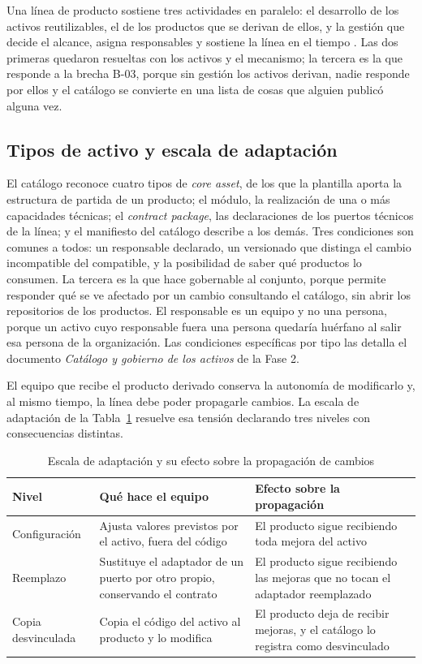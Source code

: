 Una línea de producto sostiene tres actividades en paralelo: el desarrollo de
los activos reutilizables, el de los productos que se derivan de ellos, y la
gestión que decide el alcance, asigna responsables y sostiene la línea en el
tiempo \citep{Clements2001}. Las dos primeras quedaron resueltas con los
activos y el mecanismo; la tercera es la que responde a la brecha B-03, porque
sin gestión los activos derivan, nadie responde por ellos y el catálogo se
convierte en una lista de cosas que alguien publicó alguna vez.

\subsection{Tipos de activo y escala de adaptación}

El catálogo reconoce cuatro tipos de \emph{core asset}, de los que la
plantilla aporta la estructura de partida de un producto; el módulo, la
realización de una o más capacidades técnicas; el \emph{contract package}, las
declaraciones de los puertos técnicos de la línea; y el manifiesto del
catálogo describe a los demás. Tres condiciones son comunes a todos: un
responsable declarado, un versionado que distinga el cambio incompatible del
compatible, y la posibilidad de saber qué productos lo consumen. La tercera es
la que hace gobernable al conjunto, porque permite responder qué se ve
afectado por un cambio consultando el catálogo, sin abrir los repositorios de
los productos. El responsable es un equipo y no una persona, porque un activo
cuyo responsable fuera una persona quedaría huérfano al salir esa persona de
la organización. Las condiciones específicas por tipo las detalla el documento
\emph{Catálogo y gobierno de los activos} de la Fase 2.

El equipo que recibe el producto derivado conserva la autonomía de
modificarlo y, al mismo tiempo, la línea debe poder propagarle cambios. La
escala de adaptación de la Tabla~\ref{tab:adaptacion} resuelve esa tensión
declarando tres niveles con consecuencias distintas.

\begin{table}[H]
\centering
{\footnotesize
\begin{tabular}{p{2.8cm}p{5.6cm}p{6.3cm}}
\toprule
\textbf{Nivel} & \textbf{Qué hace el equipo} & \textbf{Efecto sobre la propagación} \\
\midrule
Configuración & Ajusta valores previstos por el activo, fuera del código & El producto sigue recibiendo toda mejora del activo \\
Reemplazo & Sustituye el adaptador de un puerto por otro propio, conservando el contrato & El producto sigue recibiendo las mejoras que no tocan el adaptador reemplazado \\
Copia desvinculada & Copia el código del activo al producto y lo modifica & El producto deja de recibir mejoras, y el catálogo lo registra como desvinculado \\
\bottomrule
\end{tabular}
}
\caption{Escala de adaptación y su efecto sobre la propagación de cambios}
\label{tab:adaptacion}
\end{table}

